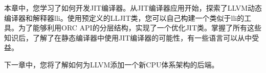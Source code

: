 本章中，您学习了如何开发JIT编译器。从JIT编译器应用开始，探索了LLVM动态编译器和解释器lli。使用预定义的LLJIT类，您可以自己构建一个类似于lli的工具。为了能够利用ORC API的分层结构，实现了一个优化JIT类。掌握了所有这些知识后，了解了在静态编译器中使用JIT编译器的可能性，有一些语言可以从中受益。\par

下一章中，您将了解如何为LLVM添加一个新CPU体系架构的后端。\par

\newpage